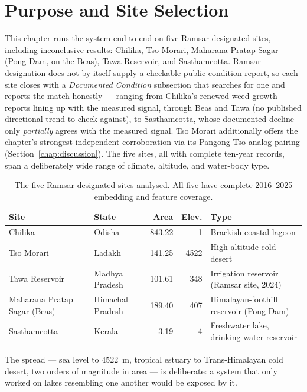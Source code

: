 \documentclass[12pt,a4paper,oneside]{report}
\begin{document}
\section{Purpose and Site Selection}

This chapter runs the system end to end on five Ramsar-designated
sites, including inconclusive results: Chilika, Tso Morari, Maharana
Pratap Sagar (Pong Dam, on the Beas), Tawa Reservoir, and
Sasthamcotta. Ramsar designation does not by itself supply a
checkable public condition report, so each site closes with a
\emph{Documented Condition} subsection that searches for one and
reports the match honestly --- ranging from Chilika's
renewed-weed-growth reports lining up with the measured signal,
through Beas and Tawa (no published directional trend to check
against), to Sasthamcotta, whose documented decline only
\emph{partially} agrees with the measured signal. Tso Morari
additionally offers the chapter's strongest independent
corroboration via its Pangong Tso analog pairing
(Section~\ref{chap:discussion}). The five sites, all with complete
ten-year records, span a deliberately wide range of climate,
altitude, and water-body type.

\begin{table}[H]
\centering
\caption{The five Ramsar-designated sites analysed. All five have
complete 2016--2025 embedding and feature coverage.}
\label{tab:ramsar_sites}
\begin{tabularx}{\textwidth}{>{\raggedright\arraybackslash}p{} l r r X}
\toprule
Site & State & Area & Elev. & Type \\
\midrule
Chilika       & Odisha           & 843.22 & 1    & Brackish coastal lagoon \\
Tso Morari    & Ladakh           & 141.25 & 4522 & High-altitude cold desert \\
Tawa Reservoir & Madhya Pradesh   & 101.61 & 348  & Irrigation reservoir (Ramsar site, 2024) \\
Maharana Pratap Sagar (Beas) & Himachal Pradesh & 189.40 & 407 & Himalayan-foothill reservoir (Pong Dam) \\
Sasthamcotta  & Kerala           & 3.19   & 4    & Freshwater lake, drinking-water reservoir \\
\bottomrule
\end{tabularx}
\end{table}

The spread --- sea level to \SI{4522}{\meter}, tropical estuary to
Trans-Himalayan cold desert, two orders of magnitude in area --- is
deliberate: a system that only worked on lakes resembling one another
would be exposed by it.
\end{document}
